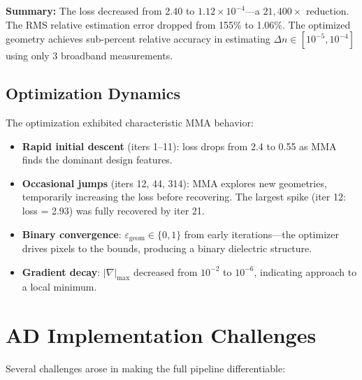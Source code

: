\documentclass[11pt,a4paper]{article}
\begin{document}
\textbf{Summary:} The loss decreased from 2.40 to $1.12 \times 10^{-4}$---a $21{,}400\times$ reduction.  The RMS relative estimation error dropped from 155\% to 1.06\%.  The optimized geometry achieves sub-percent relative accuracy in estimating $\Delta n \in [10^{-5}, 10^{-4}]$ using only 3 broadband measurements.

\subsection{Optimization Dynamics}

The optimization exhibited characteristic MMA behavior:
\begin{itemize}[nosep]
  \item \textbf{Rapid initial descent} (iters 1--11): loss drops from 2.4 to 0.55 as MMA finds the dominant design features.
  \item \textbf{Occasional jumps} (iters 12, 44, 314): MMA explores new geometries, temporarily increasing the loss before recovering.  The largest spike (iter 12: loss = 2.93) was fully recovered by iter 21.
  \item \textbf{Binary convergence}: $\varepsilon_{\text{geom}} \in \{0, 1\}$ from early iterations---the optimizer drives pixels to the bounds, producing a binary dielectric structure.
  \item \textbf{Gradient decay}: $|\nabla|_{\max}$ decreased from $10^{-2}$ to $10^{-6}$, indicating approach to a local minimum.
\end{itemize}

\section{AD Implementation Challenges}

Several challenges arose in making the full pipeline differentiable:
\end{document}
